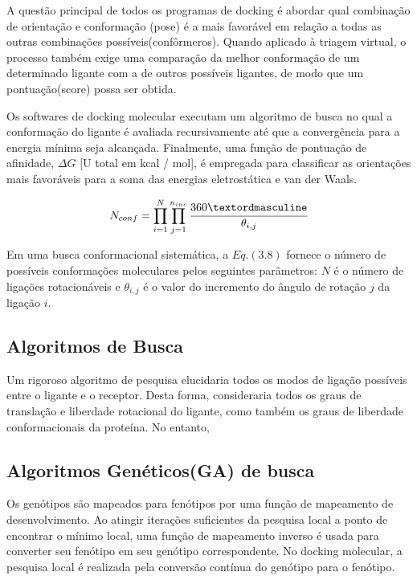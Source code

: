 A questão principal de todos os programas de docking é abordar qual combinação de orientação e conformação (pose) é a mais favorável em relação a todas as outras combinações possíveis(confôrmeros). Quando aplicado à triagem virtual, o processo também exige uma comparação da melhor conformação de um determinado ligante com a de outros possíveis ligantes, de modo que um pontuação(score) possa ser obtida. \cite{Perola2004}

Os softwares de docking molecular executam um algoritmo de busca no qual a conformação do ligante é avaliada recursivamente até que a convergência para a energia mínima seja alcançada. Finalmente, uma função de pontuação de afinidade, $\Delta G$ [U total em kcal / mol], é empregada para classificar as orientações mais favoráveis para a soma das energias eletrostática e van der Waals. \cite{Pagadala2017}

\begin{equation}
    N_{conf} = \prod^{N}_{i=1} \prod^{n_{inc}}_{j=1} \cfrac{360º}{\theta_{i, j}}
\end{equation}

Em uma busca conformacional sistemática, a $Eq.(3.8)$ fornece o número de possíveis conformações moleculares pelos seguintes parâmetros: $N$ é o número de ligações rotacionáveis e $\theta_{i, j}$ é o valor do incremento do ângulo de rotação $j$ da ligação $i$.\cite{Kitchen2004}

\subsection{Algoritmos de Busca}

Um rigoroso algoritmo de pesquisa elucidaria todos os modos de ligação possíveis entre o ligante e o receptor. Desta forma, consideraria todos os graus de translação e liberdade rotacional do ligante, como também os graus de liberdade conformacionais da proteína. No entanto, \cite{Taylor2002}

\subsection{Algoritmos Genéticos(GA) de busca}

Os genótipos são mapeados para fenótipos por uma função de mapeamento de desenvolvimento. Ao atingir iterações suficientes da pesquisa local a ponto de encontrar o mínimo local, uma função de mapeamento inverso é usada para converter seu fenótipo em seu genótipo correspondente. No docking molecular, a pesquisa local é realizada pela conversão contínua do genótipo para o fenótipo.

